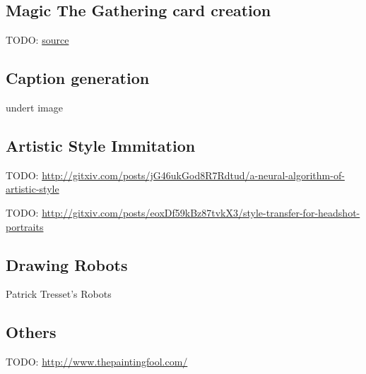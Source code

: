 \subsection{Magic The Gathering card creation}

TODO: \href{http://nerdist.com/what-happens-when-artificial-intelligence-makes-magic-the-gathering-cards/}{source}


\subsection{Caption generation}

undert image


\subsection{Artistic Style Immitation}
TODO: \href{http://gitxiv.com/posts/jG46ukGod8R7Rdtud/a-neural-algorithm-of-artistic-style}{http://gitxiv.com/posts/jG46ukGod8R7Rdtud/a-neural-algorithm-of-artistic-style}

TODO: \href{http://gitxiv.com/posts/eoxDf59kBz87tvkX3/style-transfer-for-headshot-portraits}{http://gitxiv.com/posts/eoxDf59kBz87tvkX3/style-transfer-for-headshot-portraits}

\subsection{Drawing Robots}
Patrick Tresset's Robots

\subsection{Others}

TODO: \href{http://www.thepaintingfool.com/}{http://www.thepaintingfool.com/}